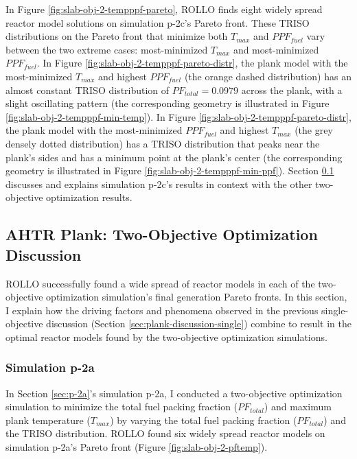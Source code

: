 In Figure \ref{fig:slab-obj-2-tempppf-pareto}, \gls{ROLLO} finds eight widely spread 
reactor model solutions on simulation p-2c's Pareto front. 
These \gls{TRISO} distributions on the Pareto front that minimize both $T_{max}$ 
and $PPF_{fuel}$ vary between the two extreme cases: 
most-minimized $T_{max}$ and most-minimized $PPF_{fuel}$.
In Figure \ref{fig:slab-obj-2-tempppf-pareto-distr}, the plank model with 
the most-minimized $T_{max}$ and highest $PPF_{fuel}$ (the orange dashed distribution) 
has an almost constant TRISO distribution of $PF_{total}=0.0979$ across the plank, 
with a slight oscillating pattern (the corresponding geometry is illustrated in Figure 
\ref{fig:slab-obj-2-tempppf-min-temp}).
In Figure \ref{fig:slab-obj-2-tempppf-pareto-distr}, the plank model with the
most-minimized $PPF_{fuel}$ and highest $T_{max}$ (the grey densely dotted 
distribution) has a TRISO distribution that peaks near the plank's sides and has 
a minimum point at the plank's center (the corresponding geometry is illustrated in Figure 
\ref{fig:slab-obj-2-tempppf-min-ppf}). 
Section \ref{sec:plank-discussion-two} discusses and explains simulation p-2c's results
in context with the other two-objective optimization results.

\subsection{AHTR Plank: Two-Objective Optimization Discussion}
\label{sec:plank-discussion-two}
\gls{ROLLO} successfully found a wide spread of reactor models in each of the 
two-objective optimization simulation's final generation Pareto fronts.
In this section, I explain how the driving factors and phenomena observed in 
the previous single-objective discussion (Section \ref{sec:plank-discussion-single}) 
combine to result in the optimal reactor models found by the two-objective optimization 
simulations. 

\subsubsection{Simulation p-2a}
In Section \ref{sec:p-2a}'s simulation p-2a, I conducted a two-objective 
optimization simulation to minimize the total fuel packing fraction ($PF_{total}$) and 
maximum plank temperature ($T_{max}$) by varying the total fuel 
packing fraction ($PF_{total}$) and the TRISO distribution. 
\gls{ROLLO} found six widely spread reactor models on simulation p-2a's Pareto 
front (Figure \ref{fig:slab-obj-2-pftemp}). 

